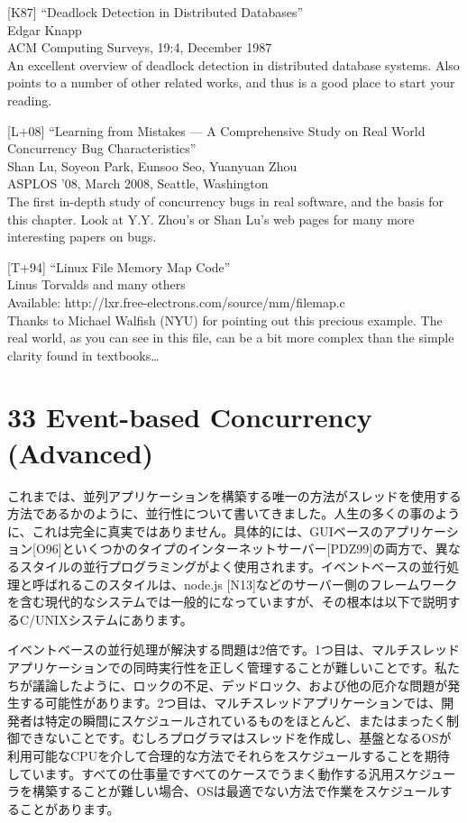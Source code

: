 {[}K87{]} ``Deadlock Detection in Distributed Databases''\\
Edgar Knapp\\
ACM Computing Surveys, 19:4, December 1987\\
An excellent overview of deadlock detection in distributed database
systems. Also points to a number of other related works, and thus is a
good place to start your reading.

{[}L+08{]} ``Learning from Mistakes --- A Comprehensive Study on Real
World Concurrency Bug Characteristics''\\
Shan Lu, Soyeon Park, Eunsoo Seo, Yuanyuan Zhou\\
ASPLOS '08, March 2008, Seattle, Washington\\
The first in-depth study of concurrency bugs in real software, and the
basis for this chapter. Look at Y.Y. Zhou's or Shan Lu's web pages for
many more interesting papers on bugs.

{[}T+94{]} ``Linux File Memory Map Code''\\
Linus Torvalds and many others\\
Available: http://lxr.free-electrons.com/source/mm/filemap.c\\
Thanks to Michael Walfish (NYU) for pointing out this precious example.
The real world, as you can see in this file, can be a bit more complex
than the simple clarity found in textbooks\ldots{}

\newpage

\hypertarget{event-based-concurrency-advanced}{%
\section*{33 Event-based Concurrency
(Advanced)}\label{event-based-concurrency-advanced}}

これまでは、並列アプリケーションを構築する唯一の方法がスレッドを使用する方法であるかのように、並行性について書いてきました。人生の多くの事のように、これは完全に真実ではありません。具体的には、GUIベースのアプリケーション{[}O96{]}といくつかのタイプのインターネットサーバー{[}PDZ99{]}の両方で、異なるスタイルの並行プログラミングがよく使用されます。イベントベースの並行処理と呼ばれるこのスタイルは、node.js
{[}N13{]}などのサーバー側のフレームワークを含む現代的なシステムでは一般的になっていますが、その根本は以下で説明するC/UNIXシステムにあります。

イベントベースの並行処理が解決する問題は2倍です。1つ目は、マルチスレッドアプリケーションでの同時実行性を正しく管理することが難しいことです。私たちが議論したように、ロックの不足、デッドロック、および他の厄介な問題が発生する可能性があります。2つ目は、マルチスレッドアプリケーションでは、開発者は特定の瞬間にスケジュールされているものをほとんど、またはまったく制御できないことです。むしろプログラマはスレッドを作成し、基盤となるOSが利用可能なCPUを介して合理的な方法でそれらをスケジュールすることを期待しています。すべての仕事量ですべてのケースでうまく動作する汎用スケジューラを構築することが難しい場合、OSは最適でない方法で作業をスケジュールすることがあります。

